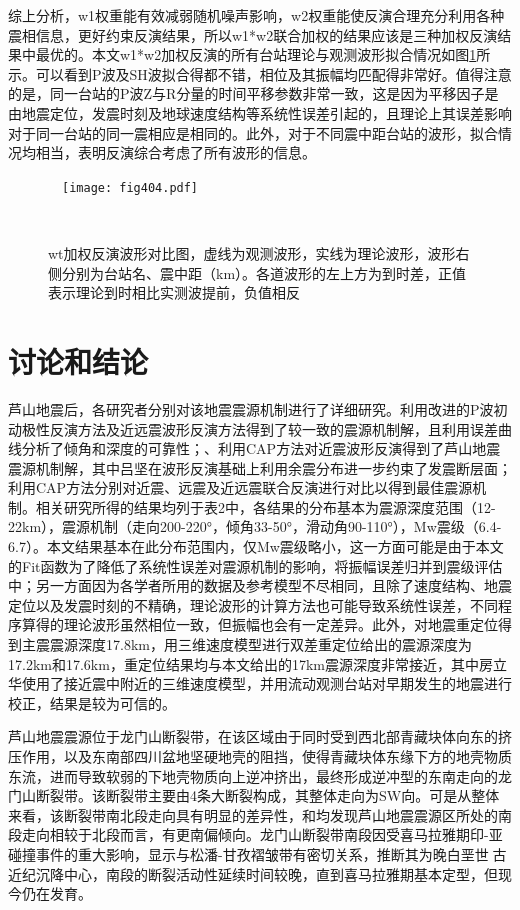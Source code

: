 综上分析，w1权重能有效减弱随机噪声影响，w2权重能使反演合理充分利用各种震相信息，更好约束反演结果，所以w1*w2联合加权的结果应该是三种加权反演结果中最优的。本文w1*w2加权反演的所有台站理论与观测波形拟合情况如图\ref{fig404}所示。可以看到P波及SH波拟合得都不错，相位及其振幅均匹配得非常好。值得注意的是，同一台站的P波Z与R分量的时间平移参数非常一致，这是因为平移因子是由地震定位，发震时刻及地球速度结构等系统性误差引起的，且理论上其误差影响对于同一台站的同一震相应是相同的。此外，对于不同震中距台站的波形，拟合情况均相当，表明反演综合考虑了所有波形的信息。
\begin{figure}
\centering
  \texttt{[image: fig404.pdf]}
  \caption{ wt加权反演波形对比图，虚线为观测波形，实线为理论波形，波形右侧分别为台站名、震中距（km）。各道波形的左上方为到时差，正值表示理论到时相比实测波提前，负值相反}
  \label{fig404}
\end{figure}

\section{讨论和结论}

芦山地震后，各研究者分别对该地震震源机制进行了详细研究。利用\citet{Hardebeck2002}改进的P波初动极性反演方法及近远震波形反演方法得到了较一致的震源机制解，且利用误差曲线分析了倾角和深度的可靠性；、利用CAP方法对近震波形反演得到了芦山地震震源机制解，其中吕坚在波形反演基础上利用余震分布进一步约束了发震断层面；利用CAP方法分别对近震、远震及近远震联合反演进行对比以得到最佳震源机制。相关研究所得的结果均列于表2中，各结果的分布基本为震源深度范围（12-22km），震源机制（走向200-220°，倾角33-50°，滑动角90-110°），Mw震级（6.4-6.7）。本文结果基本在此分布范围内，仅Mw震级略小，这一方面可能是由于本文的Fit函数为了降低了系统性误差对震源机制的影响，将振幅误差归并到震级评估中；另一方面因为各学者所用的数据及参考模型不尽相同，且除了速度结构、地震定位以及发震时刻的不精确，理论波形的计算方法也可能导致系统性误差，不同程序算得的理论波形虽然相位一致，但振幅也会有一定差异\citep{Herrmann1985}。此外，对地震重定位得到主震震源深度17.8km，用三维速度模型进行双差重定位给出的震源深度为17.2km和17.6km，重定位结果均与本文给出的17km震源深度非常接近，其中房立华使用了接近震中附近的三维速度模型，并用流动观测台站对早期发生的地震进行校正，结果是较为可信的。

芦山地震震源位于龙门山断裂带，在该区域由于同时受到西北部青藏块体向东的挤压作用，以及东南部四川盆地坚硬地壳的阻挡，使得青藏块体东缘下方的地壳物质东流，进而导致软弱的下地壳物质向上逆冲挤出，最终形成逆冲型的东南走向的龙门山断裂带\citep{Zhang2013}。该断裂带主要由4条大断裂构成，其整体走向为SW向。可是从整体来看，该断裂带南北段走向具有明显的差异性\citep{Jia2006,Arne1997}，和均发现芦山地震震源区所处的南段走向相较于北段而言，有更南偏倾向。龙门山断裂带南段因受喜马拉雅期印-亚碰撞事件的重大影响，显示与松潘-甘孜褶皱带有密切关系，推断其为晚白垩世古近纪沉降中心，南段的断裂活动性延续时间较晚，直到喜马拉雅期基本定型，但现今仍在发育。

